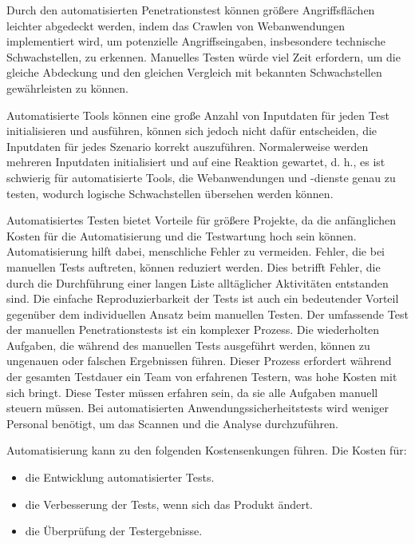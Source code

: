Durch den automatisierten Penetrationstest können größere Angriffsflächen leichter abgedeckt werden, indem das Crawlen von Webanwendungen implementiert wird, um potenzielle Angriffseingaben, insbesondere technische Schwachstellen, zu erkennen. Manuelles Testen würde viel Zeit erfordern, um die gleiche Abdeckung und den gleichen Vergleich mit bekannten Schwachstellen gewährleisten zu können\cite{packetlabs18}.

Automatisierte Tools können eine große Anzahl von Inputdaten für jeden Test initialisieren und ausführen, können sich jedoch nicht dafür entscheiden, die Inputdaten für jedes Szenario korrekt auszuführen. Normalerweise werden mehreren Inputdaten initialisiert und auf eine Reaktion gewartet, d. h., es ist schwierig für automatisierte Tools, die Webanwendungen und -dienste genau zu testen, wodurch logische Schwachstellen übersehen werden können\cite{packetlabs18}.

Automatisiertes Testen bietet Vorteile für größere Projekte, da die anfänglichen Kosten für die Automatisierung und die Testwartung hoch sein können. Automatisierung hilft dabei, menschliche Fehler zu vermeiden. Fehler, die bei manuellen Tests auftreten, können reduziert werden. Dies betrifft Fehler, die durch die Durchführung einer langen Liste alltäglicher Aktivitäten entstanden sind. Die einfache Reproduzierbarkeit der Tests ist auch ein bedeutender Vorteil gegenüber dem individuellen Ansatz beim manuellen Testen. Der umfassende Test der manuellen Penetrationstests ist ein komplexer Prozess. Die wiederholten Aufgaben, die während des manuellen Tests ausgeführt werden, können zu ungenauen oder falschen Ergebnissen führen. Dieser Prozess erfordert während der gesamten Testdauer ein Team von erfahrenen Testern, was hohe Kosten mit sich bringt. Diese Tester müssen erfahren sein, da sie alle Aufgaben manuell steuern müssen. Bei automatisierten Anwendungssicherheitstests wird weniger Personal benötigt, um das Scannen und die Analyse durchzuführen\cite{autovorteil99}.

Automatisierung kann zu den folgenden Kostensenkungen führen. Die Kosten für\cite{autovorteil99}: 

\begin{itemize} 
	\item die Entwicklung automatisierter Tests.
	\item die Verbesserung der Tests, wenn sich das Produkt ändert.
	\item die Überprüfung der Testergebnisse.
\end{itemize} 

